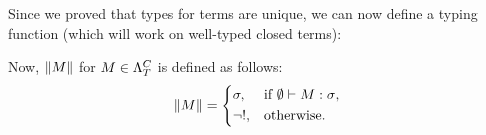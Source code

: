 \documentclass[main.tex]{subfiles}
\begin{document}
Since we proved that types for terms are unique, we can now define a typing
function (which will work on well-typed closed terms):
\begin{defn}
    Now, $\typeof{M}$ for $M \in \plambda{T}{C}$ is defined as follows:
    \[
        \typeof{M} =
        \begin{cases*}
            \sigma, & if $\emptyset \vdash M : \sigma$, \\
            \neg !, & otherwise.
        \end{cases*}
    \]
\end{defn}
\end{document}
